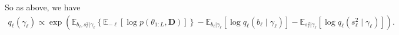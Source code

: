 \documentclass{article}
\newcommand{\E}{\mathbb{E}}
\begin{document}
\normalsize
So as above, we have 
\begin{align*}
    q_\ell(\gamma_\ell) \propto \exp\left(\E_{b_\ell,s^2_\ell|\gamma_\ell}\left\{\E_{-\ell}\left[\log p(\theta_{1:L}, \mathbf{D})\right]\right\}- \E_{b_\ell|\gamma_\ell}[\log q_\ell(b_\ell\;|\;\gamma_\ell)]- \E_{s^2_\ell|\gamma_\ell}[\log q_\ell(s^2_\ell\;|\;\gamma_\ell)]\right).
\end{align*}
\end{document}
